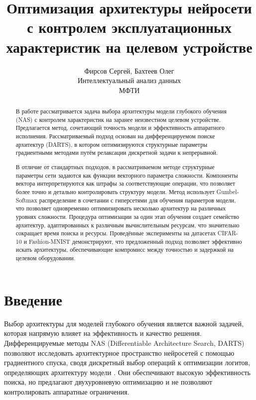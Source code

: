 \documentclass{article}
\title{Оптимизация архитектуры нейросети с контролем эксплуатационных характеристик на целевом устройстве}
\author{Фирсов Сергей, Бахтеев Олег\\ Интеллектуальный анализ данных\\МФТИ}
\begin{document}
\maketitle

\begin{abstract}
В работе рассматривается задача выбора архитектуры модели глубокого обучения (NAS) с контролем характеристик на заранее неизвестном целевом устройстве. Предлагается метод, сочетающий точность модели и эффективность аппаратного исполнения. Рассматриваемый подход основан на дифференцируемом поиске архитектур (DARTS), в котором оптимизируются структурные параметры градиентными методами путём релаксации дискретной задачи к непрерывной. %

В отличие от стандартных подходов, в рассматриваемом методе структурные параметры сети задаются как функции векторного параметра сложности. Компоненты вектора интерпретируются как штрафы за соответствующие операции, что позволяет более точно и детально контролировать структуру модели. Метод использует Gumbel-Softmax распределение в сочетании с гиперсетями для обучения параметров модели, что позволяет одновременно оптимизировать несколько архитектур на различных уровнях сложности. Процедура оптимизации за один этап обучения создает семейство архитектур, адаптированных к различным вычислительным ресурсам, что значительно сокращает время поиска и ресурсы. Проведённые эксперименты на датасетах CIFAR-10 и Fashion-MNIST демонстрируют, что предложенный подход позволяет эффективно искать архитектуры, обеспечивающие компромисс между точностью и задержкой на целевом оборудовании.

\end{abstract}

\section{Введение}

Выбор архитектуры для моделей глубокого обучения является важной задачей, которая напрямую влияет на эффективность и качество решения. Дифференцируемые методы NAS (Differentiable Architecture Search, DARTS) позволяют исследовать архитектурное пространство нейросетей с помощью градиентного спуска, сводя дискретный выбор операций к оптимизации логитов, определяющих архитектуру модели \cite{liu2019darts,Chen2019SNAS}. Они обеспечивают высокую эффективность поиска, но предлагают двухуровневую оптимизацию и не позволяют контролировать аппаратные ограничения. %
\end{document}

